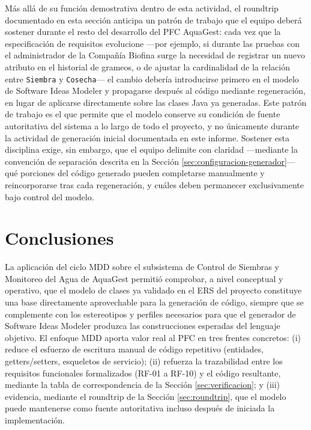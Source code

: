 \documentclass[11pt,a4paper]{article}
\begin{document}
Más allá de su función demostrativa dentro de esta actividad, el roundtrip documentado en esta sección anticipa un patrón de trabajo que el equipo deberá sostener durante el resto del desarrollo del PFC AquaGest: cada vez que la especificación de requisitos evolucione —por ejemplo, si durante las pruebas con el administrador de la Compañía Biofina surge la necesidad de registrar un nuevo atributo en el historial de grameos, o de ajustar la cardinalidad de la relación entre \texttt{Siembra} y \texttt{Cosecha}— el cambio debería introducirse primero en el modelo de Software Ideas Modeler y propagarse después al código mediante regeneración, en lugar de aplicarse directamente sobre las clases Java ya generadas. Este patrón de trabajo es el que permite que el modelo conserve su condición de fuente autoritativa del sistema a lo largo de todo el proyecto, y no únicamente durante la actividad de generación inicial documentada en este informe. Sostener esta disciplina exige, sin embargo, que el equipo delimite con claridad —mediante la convención de separación descrita en la Sección \ref{sec:configuracion-generador}— qué porciones del código generado pueden completarse manualmente y reincorporarse tras cada regeneración, y cuáles deben permanecer exclusivamente bajo control del modelo.

\section{Conclusiones}
\label{sec:conclusiones}

La aplicación del ciclo MDD sobre el subsistema de Control de Siembras y Monitoreo del Agua de AquaGest permitió comprobar, a nivel conceptual y operativo, que el modelo de clases ya validado en el ERS del proyecto constituye una base directamente aprovechable para la generación de código, siempre que se complemente con los estereotipos y perfiles necesarios para que el generador de Software Ideas Modeler produzca las construcciones esperadas del lenguaje objetivo. El enfoque MDD aporta valor real al PFC en tres frentes concretos: (i) reduce el esfuerzo de escritura manual de código repetitivo (entidades, getters/setters, esqueletos de servicio); (ii) refuerza la trazabilidad entre los requisitos funcionales formalizados (RF-01 a RF-10) y el código resultante, mediante la tabla de correspondencia de la Sección \ref{sec:verificacion}; y (iii) evidencia, mediante el roundtrip de la Sección \ref{sec:roundtrip}, que el modelo puede mantenerse como fuente autoritativa incluso después de iniciada la implementación.
\end{document}
